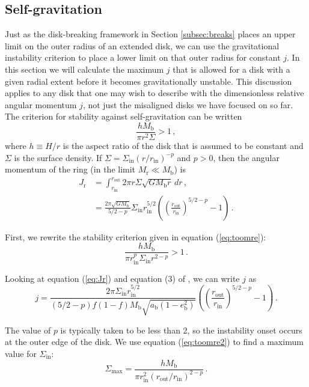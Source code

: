 \documentclass[twocolumn,linenumbers]{aastex631}
\begin{document}
\subsection{Self-gravitation}
\label{subsec:toomre}
Just as the disk-breaking framework in Section \ref{subsec:breaks} places an upper limit on the outer radius of an extended disk, we can use the gravitational instability criterion to place a lower limit on that outer radius for constant $j$. In this section we will calculate the maximum $j$ that is allowed for a disk with a given radial extent before it becomes gravitationally unstable. This discussion applies to any disk that one may wish to describe with the dimensionless relative angular momentum $j$, not just the misaligned disks we have focused on so far. The criterion for stability against self-gravitation \citep{toomre1964} can be written
\begin{equation}
    \label{eq:toomre}
    \frac{hM_\text{b}}{\pi r^2 \Sigma} > 1\, ,
\end{equation}
where $h\equiv H/r$ is the aspect ratio of the disk that is assumed to be constant and $\Sigma$ is the surface density. If $\Sigma = \Sigma_\text{in} (r/r_\text{in})^{-p}$ and $p>0$, then the angular momentum of the ring (in the limit $M_\text{r} \ll M_\text{b}$) is
\begin{align}
    J_\text{r} &= \int_{r_\text{in}}^{r_\text{out}} 2\pi r \Sigma  \sqrt{GM_\text{b}r}\,dr \, , \nonumber \\
    & = \frac{2\pi\sqrt{GM_\text{b}}}{5/2 - p} \Sigma_\text{in} r_\text{in}^{5/2} \left( \left( \frac{r_\text{out}}{r_\text{in}} \right)^{5/2 - p}- 1\right)\, \label{eq:Jr}.
\end{align}

First, we rewrite the stability criterion given in equation (\ref{eq:toomre}):
\begin{equation}
    \label{eq:toomre2}
    \frac{h M_\text{b}}{\pi r_\text{in}^p \Sigma_\text{in} r^{2-p}} > 1\, .
\end{equation}

Looking at equation (\ref{eq:Jr}) and equation (3) of \citet{abod2022}, we can write $j$ as
\begin{equation}
    \label{eq:j-full-disk}
    j = \frac{2\pi \Sigma_\text{in} r_\text{in}^{5/2}}{(5/2-p)f(1-f)M_\text{b}\sqrt{a_\text{b}(1-e_\text{b}^2)}}  \left( \left( \frac{r_\text{out}}{r_\text{in}} \right)^{5/2 - p}- 1\right) \, .
\end{equation}

The value of $p$ is typically taken to be less than 2, so the instability onset occurs at the outer edge of the disk. We use equation (\ref{eq:toomre2}) to find a maximum value for $\Sigma_\text{in}$:
\begin{equation}
    \Sigma_\text{max} = \frac{hM_\text{b}}{\pi r_\text{in}^2 (r_\text{out}/r_\text{in})^{2-p}}\, .
\end{equation}
\end{document}
